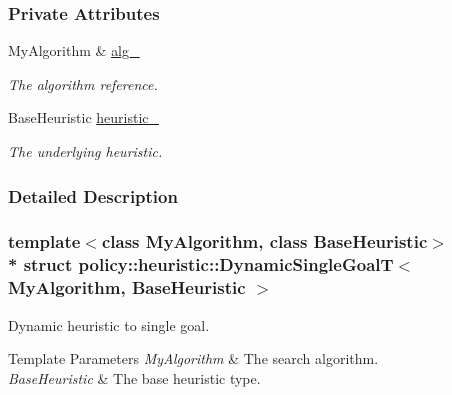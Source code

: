\subsubsection*{Private Attributes}
\begin{DoxyCompactItemize}
\item 
My\+Algorithm \& \hyperlink{structpolicy_1_1heuristic_1_1DynamicSingleGoalT_a343fe9f51fbf84ed328913a950a81ec5}{alg\+\_\+}\hypertarget{structpolicy_1_1heuristic_1_1DynamicSingleGoalT_a343fe9f51fbf84ed328913a950a81ec5}{}\label{structpolicy_1_1heuristic_1_1DynamicSingleGoalT_a343fe9f51fbf84ed328913a950a81ec5}

\begin{DoxyCompactList}\small\item\em The algorithm reference. \end{DoxyCompactList}\item 
Base\+Heuristic \hyperlink{structpolicy_1_1heuristic_1_1DynamicSingleGoalT_a81a18cb05289c62d26f7a9b6590668e9}{heuristic\+\_\+}\hypertarget{structpolicy_1_1heuristic_1_1DynamicSingleGoalT_a81a18cb05289c62d26f7a9b6590668e9}{}\label{structpolicy_1_1heuristic_1_1DynamicSingleGoalT_a81a18cb05289c62d26f7a9b6590668e9}

\begin{DoxyCompactList}\small\item\em The underlying heuristic. \end{DoxyCompactList}\end{DoxyCompactItemize}


\subsubsection{Detailed Description}
\subsubsection*{template$<$class My\+Algorithm, class Base\+Heuristic$>$\\*
struct policy\+::heuristic\+::\+Dynamic\+Single\+Goal\+T$<$ My\+Algorithm, Base\+Heuristic $>$}

Dynamic heuristic to single goal. 


\begin{DoxyTemplParams}{Template Parameters}
{\em My\+Algorithm} & The search algorithm. \\
\hline
{\em Base\+Heuristic} & The base heuristic type. \\
\hline
\end{DoxyTemplParams}



